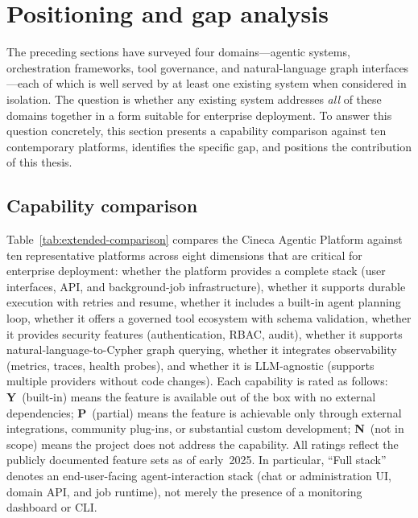 \documentclass[a4paper]{sapthesis}
\begin{document}
\section{Positioning and gap analysis}
\label{sec:gap-analysis}

The preceding sections have surveyed four domains---agentic systems,
orchestration frameworks, tool governance, and natural-language graph
interfaces---each of which is well served by at least one existing system
when considered in isolation.  The question is whether any existing system
addresses \emph{all} of these domains together in a form suitable for
enterprise deployment.  To answer this question concretely, this section
presents a capability comparison against ten contemporary platforms,
identifies the specific gap, and positions the contribution of this thesis.

\subsection{Capability comparison}

Table~\ref{tab:extended-comparison} compares the Cineca Agentic Platform
against ten representative platforms across eight dimensions that are
critical for enterprise deployment: whether the platform provides a
complete stack (user interfaces, API, and background-job infrastructure),
whether it supports durable execution with retries and resume, whether it
includes a built-in agent planning loop, whether it offers a governed tool
ecosystem with schema validation, whether it provides security features
(authentication, RBAC, audit), whether it supports natural-language-to-Cypher
graph querying, whether it integrates observability (metrics, traces, health
probes), and whether it is LLM-agnostic (supports multiple providers without
code changes).  Each capability is rated as follows: \textbf{Y}~(built-in)
means the feature is available out of the box with no external dependencies;
\textbf{P}~(partial) means the feature is achievable only through external
integrations, community plug-ins, or substantial custom development;
\textbf{N}~(not in scope) means the project does not address the capability.
All ratings reflect the publicly documented feature sets as of early~2025.
In particular, ``Full stack'' denotes an end-user-facing agent-interaction
stack (chat or administration UI, domain API, and job runtime), not merely
the presence of a monitoring dashboard or CLI.
\end{document}
